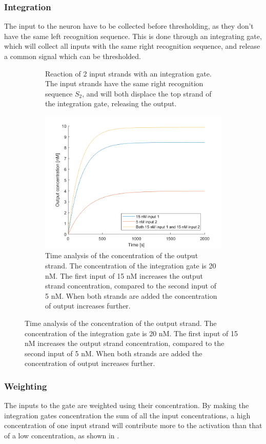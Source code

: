 \subsubsection{Integration}
The input to the neuron have to be collected before thresholding, as they don't have the same left recognition sequence. This is done through an integrating gate, which will collect all inputs with the same right recognition sequence, and release a common signal which can be thresholded.

\begin{figure}[H]
  \begin{subfigure}[t]{.49\columnwidth}
    \centering
{} {

}
\caption{Reaction of 2 input strands with an integration gate. The input strands have the same right recognition sequence $S_2$, and will both displace the top strand of the integration gate, releasing the output.}
\label{}
\end{subfigure}
\hfill
\begin{subfigure}[t]{.49\columnwidth}
  \centering
\includegraphics[width=\linewidth]{images/integration.png}
\caption{Time analysis of the concentration of the output strand. The concentration of the integration gate is 20 nM. The first input of 15 nM increases the output strand concentration, compared to the second input of 5 nM. When both strands are added the concentration of output increases further.}
\label{}
\end{subfigure}
\label{seesaw_integration}
\end{figure}

\subsubsection{Weighting}
The inputs to the gate are weighted using their concentration. By making the integration gates concentration the sum of all the input concentrations, a high concentration of one input strand will contribute more to the activation than that of a low concentration, as shown in .


